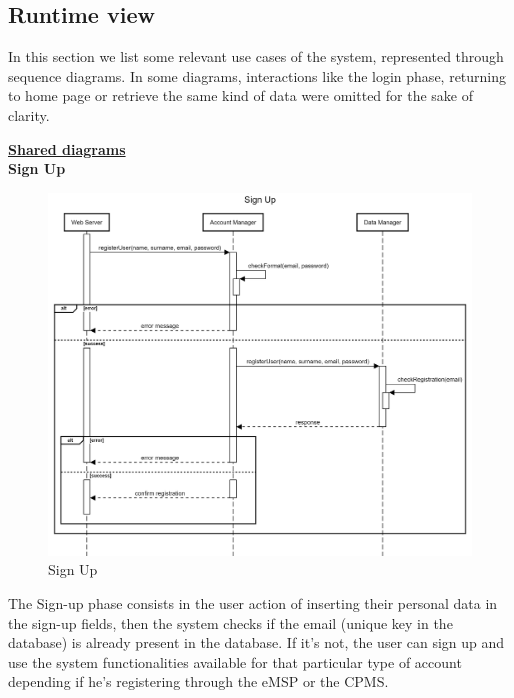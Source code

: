 \documentclass[table, 12pt]{article}
\begin{document}
\subsection{Runtime view}

In this section we list some relevant use cases of the system, represented through sequence diagrams. 
In some diagrams, interactions like the login phase, returning to home page or retrieve the same kind of data were omitted for the sake of clarity.

\newpage
\underline{\textbf{Shared diagrams}}\\
\textbf{Sign Up}
\begin{center}
    \begin{figure}[H]
        \includegraphics[scale=0.15, center]{assets/sequenceDiagrams/shared signup.png}
        \caption{Sign Up}
        \label{fig:signup}
    \end{figure}
\end{center}
The Sign-up phase consists in the user action of inserting their personal data in the sign-up fields, then the system checks if the email (unique key in the database) is already present in the database.
If it's not, the user can sign up and use the system functionalities available for that particular type of account depending if he's registering through the eMSP or the CPMS.

\newpage
\end{document}
